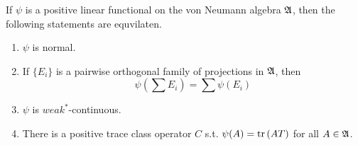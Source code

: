 \documentclass[a4paper,11pt]{report}
\begin{document}
\begin{thm}
	If $\psi$ is a positive linear functional on the von Neumann algebra $\mathfrak{A}$, then the following statements are equvilaten.
	\begin{enumerate}[label = \arabic*)]
		\item $\psi$ is normal.
		\item If $\{E_i\}$ is a pairwise orthogonal family of projections in $\mathfrak{A}$, then 
		\begin{equation*}
			\psi(\sum E_i) = \sum \psi(E_i)
		\end{equation*}
		\item $\psi$ is $weak^*$-continuous.
		\item There is a positive trace class operator $C$ s.t. $\psi(A) = \operatorname{tr}{(AT)}$ for all $A \in \mathfrak{A}$.
	\end{enumerate}
\end{thm}
\end{document}

